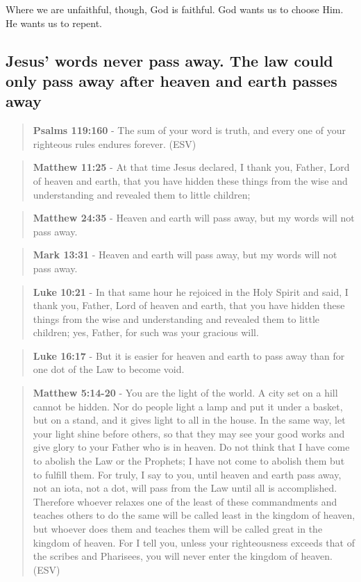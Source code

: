 \documentclass[11pt]{article}
\begin{document}
Where we are unfaithful, though, God is faithful. God wants us to choose Him. He wants us to repent.

\subsection{Jesus' words never pass away. The law could only pass away after heaven and earth passes away}
\label{sec:org2a85bc9}
\begin{quote}
\textbf{Psalms 119:160} - The sum of your word is truth, and every one of your righteous rules endures forever. (ESV)
\end{quote}

\begin{quote}
\textbf{Matthew 11:25} - At that time Jesus declared, I thank you, Father, Lord of heaven and earth, that you have hidden these things from the wise and understanding and revealed them to little children;
\end{quote}

\begin{quote}
\textbf{Matthew 24:35} - Heaven and earth will pass away, but my words will not pass away.
\end{quote}

\begin{quote}
\textbf{Mark 13:31} - Heaven and earth will pass away, but my words will not pass away.
\end{quote}

\begin{quote}
\textbf{Luke 10:21} - In that same hour he rejoiced in the Holy Spirit and said, I thank you, Father, Lord of heaven and earth, that you have hidden these things from the wise and understanding and revealed them to little children; yes, Father, for such was your gracious will.
\end{quote}

\begin{quote}
\textbf{Luke 16:17} - But it is easier for heaven and earth to pass away than for one dot of the Law to become void.
\end{quote}

\begin{quote}
\textbf{Matthew 5:14-20} - You are the light of the world. A city set on a hill cannot be hidden. Nor do people light a lamp and put it under a basket, but on a stand, and it gives light to all in the house. In the same way, let your light shine before others, so that they may see your good works and give glory to your Father who is in heaven. Do not think that I have come to abolish the Law or the Prophets; I have not come to abolish them but to fulfill them. For truly, I say to you, until heaven and earth pass away, not an iota, not a dot, will pass from the Law until all is accomplished. Therefore whoever relaxes one of the least of these commandments and teaches others to do the same will be called least in the kingdom of heaven, but whoever does them and teaches them will be called great in the kingdom of heaven. For I tell you, unless your righteousness exceeds that of the scribes and Pharisees, you will never enter the kingdom of heaven. (ESV)
\end{quote}
\end{document}
